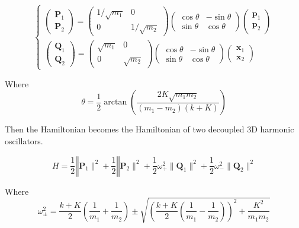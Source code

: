 \documentclass[a4paper,11pt]{article}
\begin{document}
\begin{equation}
    \begin{cases}
        \begin{pmatrix}\mathbf P_1 \\ \mathbf P_2\end{pmatrix}
        = 
        \begin{pmatrix} 1/\sqrt{m_1} & 0 \\ 0 & 1/\sqrt{m_2} \end{pmatrix}
        \begin{pmatrix}\cos\theta & -\sin\theta \\ \sin\theta & \cos\theta\end{pmatrix}
        \begin{pmatrix}\mathbf p_1 \\ \mathbf p_2\end{pmatrix}\\
        \begin{pmatrix}\mathbf Q_1 \\ \mathbf Q_2\end{pmatrix}
        = 
        \begin{pmatrix} \sqrt{m_1} & 0 \\ 0 & \sqrt{m_2}\end{pmatrix}
        \begin{pmatrix}\cos\theta & -\sin\theta \\ \sin\theta & \cos\theta\end{pmatrix}
        \begin{pmatrix}\mathbf x_1 \\ \mathbf x_2\end{pmatrix}
    \end{cases}
\end{equation}

Where
\begin{equation}
    \theta = \frac{1}{2}\arctan\left(\frac{2K\sqrt{m_1m_2}}{(m_1-m_2)(k + K)}\right)
\end{equation}

Then the Hamiltonian becomes the Hamiltonian of two decoupled 3D harmonic oscillators.

\begin{equation}
    H = \frac{1}{2}\mathbf \|\mathbf P_1\|^2 + \frac{1}{2}\mathbf \|\mathbf P_2\|^2+\frac{1}{2}\omega_+^2\|\mathbf Q_1\|^2+\frac{1}{2}\omega_-^2\|\mathbf Q_2\|^2
\end{equation}

Where
\begin{equation}
    \omega^2_{\pm} = \frac{k + K}{2}\left(\frac{1}{m_1} + \frac{1}{m_2}\right) \pm \sqrt{\left(\frac{k+K}{2}\left(\frac{1}{m_1} - \frac{1}{m_2}\right)\right)^2 + \frac{K^2}{m_1m_2}}
\end{equation}
\end{document}
